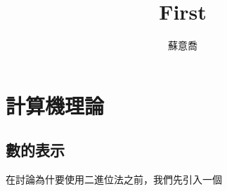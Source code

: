 \documentclass[B5paper]{book}
\title{First}
\author{蘇意喬}
\begin{document}
	\chapter{計算機理論}
	\section{數的表示}
	在討論為什要使用二進位法之前，我們先引入一個
\end{document}
